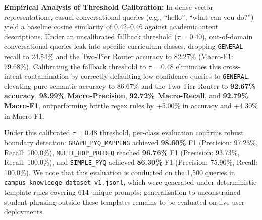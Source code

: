 \documentclass[conference]{IEEEtran}
\newcommand{\code}[1]{\texttt{\small #1}}
\begin{document}
\begin{table}[htbp]
\caption{Intent Routing Performance on Ground-Truth Dataset ($N = 1{,}500$)}
\label{tab:intent_eval}
\centering
{}
\end{table}

\textbf{Empirical Analysis of Threshold Calibration:} In dense vector representations, casual conversational queries (e.g., ``hello'', ``what can you do?'') yield a baseline cosine similarity of 0.42--0.46 against academic intent descriptions. Under an uncalibrated fallback threshold ($\tau=0.40$), out-of-domain conversational queries leak into specific curriculum classes, dropping \texttt{GENERAL} recall to 24.54\% and the Two-Tier Router accuracy to 82.27\% (Macro-F1: 79.68\%). Calibrating the fallback threshold to $\tau=0.48$ eliminates this cross-intent contamination by correctly defaulting low-confidence queries to \texttt{GENERAL}, elevating pure semantic accuracy to 86.67\% and the Two-Tier Router to \textbf{92.67\% accuracy}, \textbf{93.99\% Macro-Precision}, \textbf{92.72\% Macro-Recall}, and \textbf{92.79\% Macro-F1}, outperforming brittle regex rules by +5.00\% in accuracy and +4.30\% in Macro-F1.

Under this calibrated $\tau=0.48$ threshold, per-class evaluation confirms robust boundary detection: \texttt{GRAPH\_PYQ\_MAPPING} achieved \textbf{98.60\%} F1 (Precision: 97.23\%, Recall: 100.0\%), \texttt{MULTI\_HOP\_PREREQ} reached \textbf{96.76\%} F1 (Precision: 93.73\%, Recall: 100.0\%), and \texttt{SIMPLE\_PYQ} achieved \textbf{86.30\%} F1 (Precision: 75.90\%, Recall: 100.0\%). We note that this evaluation is conducted on the 1,500 queries in \code{campus\_knowledge\_dataset\_v1.jsonl}, which were generated under deterministic template rules covering 614 unique prompts; generalisation to unconstrained student phrasing outside these templates remains to be evaluated on live user deployments.
\end{document}
